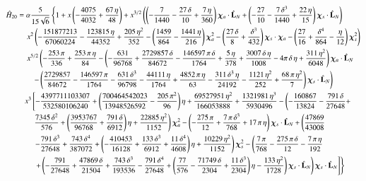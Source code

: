 \documentclass[prd,preprintnumbers,twocolumn,eqsecnum,floatfix,letter]{revtex4}
\begin{document}
\begin{widetext}
\begin{align}\label{eq:H20}
\hat{H}_{20} &= \alpha \frac{5}{15\sqrt{6}}\left\{ 1 + x\left(-\frac{4075}{4032} + \frac{67 \, \eta}{48}\right)+ x^{3/2}\left(\left(-\frac{7}{1440} -\frac{27 \, \delta}{10} + \frac{7 \,\eta}{360}\right)\bm{\chi}_a \cdot \hat{\mathbf{L}}_N+\left(-\frac{27}{10} -\frac{7 \, \delta^3}{1440} + \frac{22 \, \eta}{15}\right)\bm{\chi}_s \cdot \hat{\mathbf{L}}_N\right)\right. \nonumber \\
& \quad \left. x^2\left(-\frac{151877213}{67060224} -\frac{123815 \, \eta}{44352} +\frac{205 \, \eta^2}{352} -\left(\frac{1459}{864} -\frac{1441 \, \eta}{216}\right)\bm{\chi}_a^2 - \left(\frac{27 \, \delta}{8} +\frac{\delta^3}{432}\right)\bm{\chi}_s \cdot \bm{\chi}_a - \left(\frac{27}{16}+\frac{\delta^4}{864} -\frac{\eta}{12}\right)\bm{\chi}_s^2\right)\right. \nonumber \\
& \quad \left. x^{5/2}\left(-\frac{253 \, \pi}{336}+ \frac{253 \, \pi \, \eta}{84} -\left(-\frac{631}{96768} + \frac{2729857 \, \delta}{84672} -\frac{146597 \, \pi \, \delta}{1764}+\frac{5 \, \eta}{378}+\frac{3007 \, \delta \, \eta}{1008} -4\pi \, \delta \, \eta +\frac{311 \, \eta^2}{6048}\right)\bm{\chi}_a \cdot \hat{\mathbf{L}}_N\right.\right. \nonumber\\
& \qquad\left. -\left(\frac{2729857}{84672}-\frac{146597 \, \pi}{1764}-\frac{631 \, \delta^3 }{96798} -\frac{44111 \, \eta}{1764}+\frac{4852 \, \pi \, \eta}{63}-\frac{311 \, \delta^3 \, \eta}{24192}-\frac{1121 \, \eta^2}{252} +\frac{68 \, \pi \, \eta^2}{7}\right)\bm{\chi}_s \cdot \hat{\mathbf{L}}_N\right) \nonumber \\
& \quad  x^3\left[-\frac{4397711103307}{532580106240} + \left( \frac{700464542023}{13948526592} - \frac{205 \, \pi^2}{96}\right)\eta + \frac{69527951 \, \eta^2}{166053888} + \frac{1321981 \, \eta^3}{5930496} -  \left(-\frac{160867}{13824} -\frac{791 \, \delta}{27648} + \right.\right. \nonumber \\
& \qquad \left. \frac{7345 \, \delta^2}{576} + \left(\frac{3953767}{96768}+\frac{791 \, \delta}{6912}\right)\eta + \frac{22885 \, \eta^2}{1152}\right)\bm{\chi}_a^2 -\left(-\frac{275 \, \pi}{12} + \frac{7 \, \pi \, \delta^3}{768} + 17 \, \pi \, \eta \right)\bm{\chi}_s \cdot \hat{\mathbf{L}}_N + \left(\frac{47869}{43008}  \right.\nonumber\\
& \qquad \left.\left. - \frac{791 \, \delta^3}{27648} + \frac{743 \, \delta^4}{387072} + \left(-\frac{410453}{16128} + \frac{133 \, \delta^3}{6912} + \frac{11 \, \delta^4}{4608}\right)\eta + \frac{10229 \, \eta^2}{1152}\right)\bm{\chi}_s^2 - \left( \frac{7 \, \pi}{768}-\frac{275 \, \pi \, \delta}{12}-\frac{7 \, \pi \, \eta}{192}\right.\right. \nonumber \\
&\qquad \left.\left.\left. + \left(-\frac{791}{27648} + \frac{47869 \, \delta}{21504} + \frac{743 \, \delta^3}{193536} - \frac{791 \, \delta^4}{27648} + \left(\frac{77}{576} - \frac{71749 \, \delta}{2304} + \frac{11 \, \delta^3}{2304}\right)\eta - \frac{133 \, \eta^2}{1728}\right)\bm{\chi}_s \cdot \hat{\mathbf{L}}_N\right)\bm{\chi}_s \cdot \hat{\mathbf{L}}_N
\right]
\right\}
\end{align}

\end{widetext}
\end{document}
